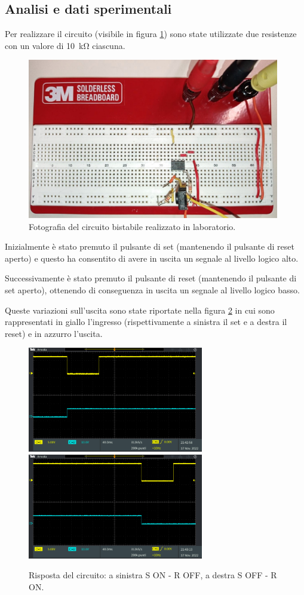 \documentclass{report}
\begin{document}
\subsection{Analisi e dati sperimentali}
Per realizzare il circuito (visibile in figura \ref{figura:circuito2}) sono state utilizzate due resistenze con un valore di \SI{10}{\kilo\ohm} ciascuna.

\begin{figure}[h!]
	\centering
	\includegraphics[height=7cm]{immagini/circuito2}
	\caption{Fotografia del circuito bistabile realizzato in laboratorio.}
	\label{figura:circuito2}
\end{figure}

\noindent Inizialmente è stato premuto il pulsante di set (mantenendo il pulsante di reset aperto) e questo ha consentito di avere in uscita un segnale al livello logico alto.

Successivamente è stato premuto il pulsante di reset (mantenendo il pulsante di set aperto), ottenendo di conseguenza in uscita un segnale al livello logico basso.

Queste variazioni sull'uscita sono state riportate nella figura \ref{figura:TEK00012e13} in cui sono rappresentati in giallo l'ingresso (rispettivamente a sinistra il set e a destra il reset) e in azzurro l'uscita.

\begin{figure}[h!]
	\centering
	\includegraphics[height=4.6cm]{immagini/TEK00016}
	\includegraphics[height=4.6cm]{immagini/TEK00017}
	\caption{Risposta del circuito: a sinistra S ON - R OFF, a destra S OFF - R ON.}
	\label{figura:TEK00012e13}
\end{figure}
\end{document}
